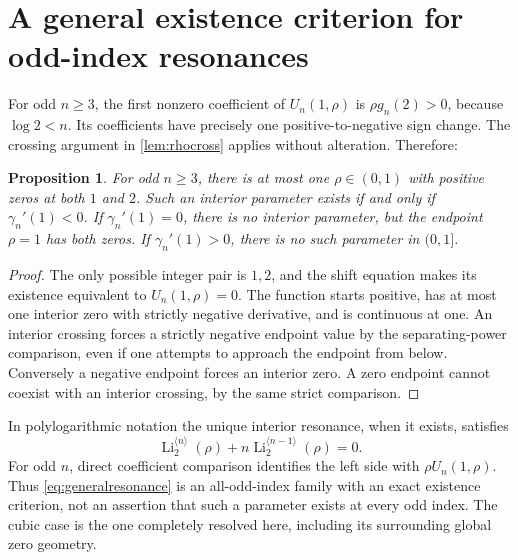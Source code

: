 \documentclass[11pt]{article}
\numberwithin{equation}{section}
\newtheorem{proposition}[proposition]{Proposition}
\theoremstyle{definition}
\newcommand{\Li}{\operatorname{Li}}
\newcommand{\ordli}[2]{\Li_{#1}^{\langle #2\rangle}}
\begin{document}
\appendix
\section{A general existence criterion for odd-index resonances}
\label{app:oddres}
For odd $n\geq3$, the first nonzero coefficient of $U_n(1,\rho)$ is
$\rho g_n(2)>0$, because $\log2<n$. Its coefficients have precisely one
positive-to-negative sign change. The crossing argument in
\cref{lem:rhocross} applies without alteration. Therefore:
\begin{proposition}\label{prop:oddres}
For odd $n\geq3$, there is at most one $\rho\in(0,1)$ with positive zeros
at both $1$ and $2$. Such an interior parameter exists if and only if
$\gamma_n'(1)<0$. If $\gamma_n'(1)=0$, there is no interior parameter,
but the endpoint $\rho=1$ has both zeros. If $\gamma_n'(1)>0$, there is
no such parameter in $(0,1]$.
\end{proposition}
\begin{proof}
The only possible integer pair is $1,2$, and the shift equation makes its
existence equivalent to $U_n(1,\rho)=0$. The function starts positive,
has at most one interior zero with strictly negative derivative, and is
continuous at one. An interior crossing forces a strictly negative
endpoint value by the separating-power comparison, even if one attempts
to approach the endpoint from below. Conversely a negative endpoint
forces an interior zero. A zero endpoint cannot coexist with an interior
crossing, by the same strict comparison.
\end{proof}
In polylogarithmic notation the unique interior resonance, when it exists,
satisfies
\begin{equation}\label{eq:generalresonance}
 \boxed{\ordli{2}{n}(\rho)+n\ordli{2}{n-1}(\rho)=0.}
\end{equation}
For odd $n$, direct coefficient comparison identifies the left side with
$\rho U_n(1,\rho)$. Thus \eqref{eq:generalresonance} is an all-odd-index
family with an exact existence criterion, not an assertion that such a
parameter exists at every odd index. The cubic case is the one completely
resolved here, including its surrounding global zero geometry.
\end{document}
